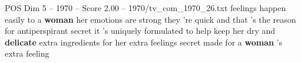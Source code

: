 \begin{textsample}{POS Dim 5 – 1970 – Score 2.00 – 1970/tv\_com\_1970\_26.txt}  \label{ex:f5_pos_056}
feelings happen easily to a \textbf{woman} her emotions are strong they 're quick and that 's the reason for antiperspirant secret it 's uniquely formulated to help keep her dry and \textbf{delicate} extra ingredients for her extra feelings secret made for a \textbf{woman} 's extra feeling

\end{textsample}
